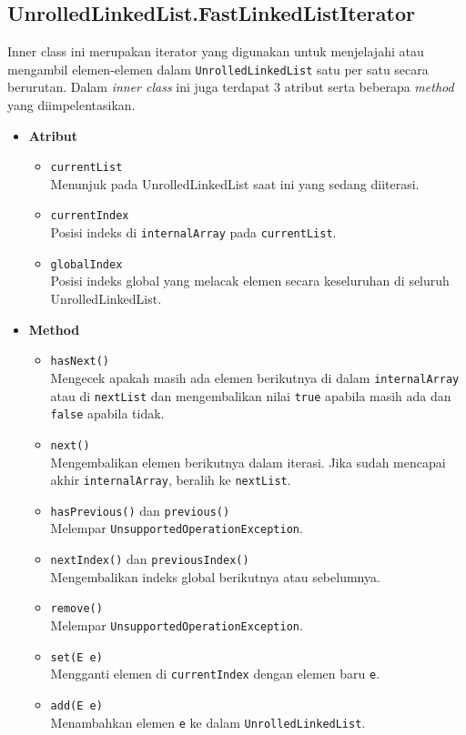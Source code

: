 \subsection{UnrolledLinkedList.FastLinkedListIterator}
Inner class ini merupakan iterator yang digunakan untuk menjelajahi atau mengambil elemen-elemen dalam \texttt{UnrolledLinkedList} satu per satu secara berurutan. Dalam \textit{inner class} ini juga terdapat 3 atribut serta beberapa \textit{method} yang diimpelentasikan.
\begin{itemize}
    \item \textbf{Atribut}
    \begin{itemize}
        \item \texttt{currentList}
        \\ Menunjuk pada UnrolledLinkedList saat ini yang sedang diiterasi.
        \item \texttt{currentIndex}
        \\ Posisi indeks di \texttt{internalArray} pada \texttt{currentList}.
        \item \texttt{globalIndex}
        \\ Posisi indeks global yang melacak elemen secara keseluruhan di seluruh UnrolledLinkedList.
    \end{itemize}

    \item \textbf{Method}
    \begin{itemize}
        \item \texttt{hasNext()}
        \\ Mengecek apakah masih ada elemen berikutnya di dalam \texttt{internalArray} atau di \texttt{nextList} dan mengembalikan nilai \texttt{true} apabila masih ada dan \texttt{false} apabila tidak.
        \item \texttt{next()}
        \\Mengembalikan elemen berikutnya dalam iterasi. Jika sudah mencapai akhir \texttt{internalArray}, beralih ke \texttt{nextList}.
        \item \texttt{hasPrevious()} dan \texttt{previous()}
        \\Melempar \texttt{UnsupportedOperationException}.
        \item \texttt{nextIndex()} dan \texttt{previousIndex()}
        \\Mengembalikan indeks global berikutnya atau sebelumnya.
        \item \texttt{remove()}
        \\Melempar \texttt{UnsupportedOperationException}.
        \item \texttt{set(E e)}
        \\Mengganti elemen di \texttt{currentIndex} dengan elemen baru \texttt{e}.
        \item \texttt{add(E e)}
        \\Menambahkan elemen \texttt{e} ke dalam \texttt{UnrolledLinkedList}.
    \end{itemize}
\end{itemize}

